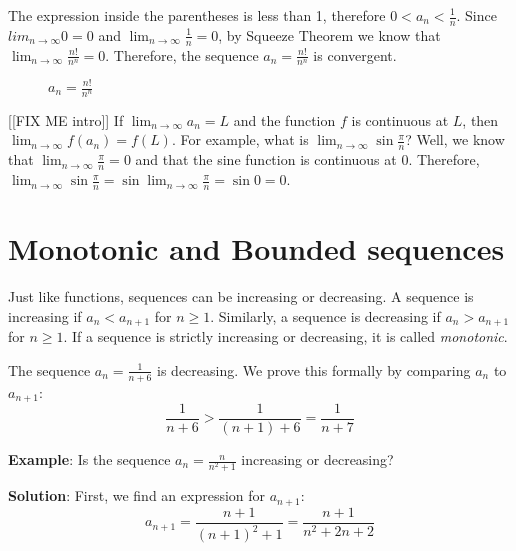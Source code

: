 The expression inside the parentheses is less than 1, therefore $0 < a_n < 
\frac{1}{n}$. Since $lim_{n \to \infty} 0 = 0$ and $\lim_{n \to \infty} 
\frac{1}{n} = 0$, by Squeeze Theorem we know that $\lim_{n \to \infty} 
\frac{n!}{n^n} = 0$. Therefore, the sequence $a_n = \frac{n!}{n^n}$ is 
convergent. 

\begin{figure}[htbp]
\centering
    \caption{$a_n = \frac{n!}{n^n}$}
    \label{fig:factorial}
\end{figure}

[[FIX ME intro]]
If $\lim_{n \to \infty} a_n = L$ and the function $f$ is continuous at $L$, 
then $\lim_{n \to \infty} f(a_n) = f(L)$. For example, what is $\lim_{n \to 
\infty} \sin{\frac{\pi}{n}}$? Well, we know that $\lim_{n \to \infty} 
\frac{\pi}{n} = 0$ and that the sine function is continuous at 0. Therefore, 
$\lim_{n \to \infty} \sin{\frac{\pi}{n}} = \sin{\lim_{n \to \infty} 
\frac{\pi}{n}} = \sin{0} = 0$. 

\section{Monotonic and Bounded sequences}
Just like functions, sequences can be increasing or decreasing. A sequence is 
increasing if $a_n < a_{n+1}$ for $n \geq 1$. Similarly, a sequence is 
decreasing if $a_n > a_{n+1}$ for $n \geq 1$. If a sequence is strictly 
increasing or decreasing, it is called \textit{monotonic}. 

The sequence $a_n = \frac{1}{n + 6}$ is decreasing. We prove this formally by 
comparing $a_n$ to $a_{n+1}$:
$$\frac{1}{n + 6} > \frac{1}{(n + 1) + 6} = \frac{1}{n + 7}$$

\textbf{Example}: Is the sequence $a_n = \frac{n}{n^2 + 1}$ increasing or 
decreasing? 

\textbf{Solution}: First, we find an expression for $a_{n+1}$:
$$a_{n + 1} = \frac{n + 1}{(n + 1)^2 + 1} = \frac{n + 1}{n^2 + 2n + 2}$$

